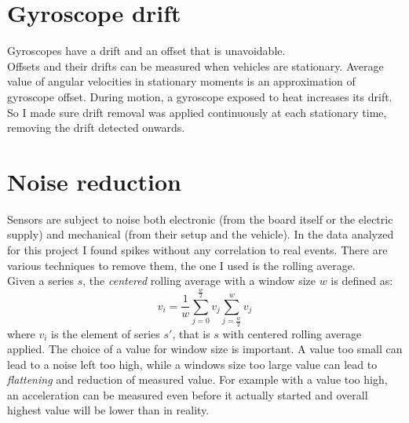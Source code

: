 \section{Gyroscope drift}
Gyroscopes have a drift and an offset that is unavoidable. \cite{6727722} \\
Offsets and their drifts can be measured when vehicles are stationary. Average value of angular velocities in stationary moments is an approximation of gyroscope offset.
During motion, a gyroscope exposed to heat increases its drift. So I made sure drift removal was applied continuously at each stationary time, removing the drift detected onwards. 

\section{Noise reduction}
Sensors are subject to noise both electronic (from the board itself or the electric supply) and mechanical (from their setup and the vehicle). In the data analyzed for this project I found spikes without any correlation to real events.
There are various techniques to remove them, the one I used is the rolling average. \\ %
Given a series $s$, the \textit{centered} rolling average with a window size $w$ is defined as:
$$ v_i = \frac{1}{w} \sum_{j=0}^{\frac{w}{2}}v_j \sum_{j=\frac{w}{2}}^{w}v_j $$
where $v_i$ is the element of series $s'$, that is $s$ with centered rolling average applied.
The choice of a value for window size is important. A value too small can lead to a noise left too high, while a windows size too large value can lead to \textit{flattening} and reduction of measured value. For example with a value too high, an acceleration can be measured even before it actually started and overall highest value will be lower than in reality.

